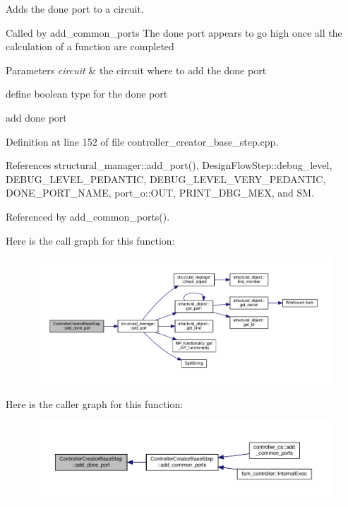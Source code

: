 Adds the done port to a circuit. 

Called by add\+\_\+common\+\_\+ports The done port appears to go high once all the calculation of a function are completed 
\begin{DoxyParams}{Parameters}
{\em circuit} & the circuit where to add the done port \\
\hline
\end{DoxyParams}
define boolean type for the done port

add done port 

Definition at line 152 of file controller\+\_\+creator\+\_\+base\+\_\+step.\+cpp.



References structural\+\_\+manager\+::add\+\_\+port(), Design\+Flow\+Step\+::debug\+\_\+level, D\+E\+B\+U\+G\+\_\+\+L\+E\+V\+E\+L\+\_\+\+P\+E\+D\+A\+N\+T\+IC, D\+E\+B\+U\+G\+\_\+\+L\+E\+V\+E\+L\+\_\+\+V\+E\+R\+Y\+\_\+\+P\+E\+D\+A\+N\+T\+IC, D\+O\+N\+E\+\_\+\+P\+O\+R\+T\+\_\+\+N\+A\+ME, port\+\_\+o\+::\+O\+UT, P\+R\+I\+N\+T\+\_\+\+D\+B\+G\+\_\+\+M\+EX, and SM.



Referenced by add\+\_\+common\+\_\+ports().

Here is the call graph for this function\+:
\nopagebreak
\begin{figure}[H]
\begin{center}
\leavevmode
\includegraphics[width=350pt]{d5/d28/classControllerCreatorBaseStep_a541e663f888f8a3af8d382fb71c929c1_cgraph}
\end{center}
\end{figure}
Here is the caller graph for this function\+:
\nopagebreak
\begin{figure}[H]
\begin{center}
\leavevmode
\includegraphics[width=350pt]{d5/d28/classControllerCreatorBaseStep_a541e663f888f8a3af8d382fb71c929c1_icgraph}
\end{center}
\end{figure}
\mbox{\label{classControllerCreatorBaseStep_a7ed45c9688186b9d940d8eb50fead293}} 
